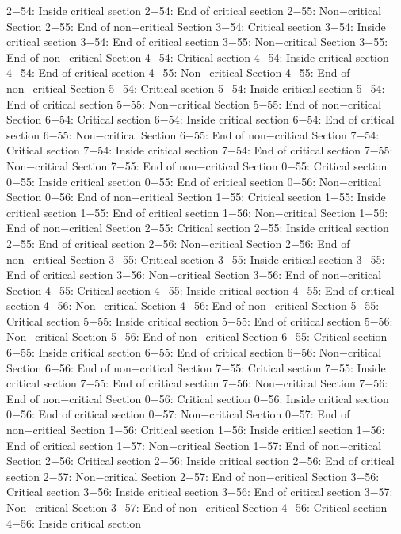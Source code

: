 2−54: Inside critical section
2−54: End of critical section
2−55: Non−critical Section
2−55: End of non−critical Section
3−54: Critical section
3−54: Inside critical section
3−54: End of critical section
3−55: Non−critical Section
3−55: End of non−critical Section
4−54: Critical section
4−54: Inside critical section
4−54: End of critical section
4−55: Non−critical Section
4−55: End of non−critical Section
5−54: Critical section
5−54: Inside critical section
5−54: End of critical section
5−55: Non−critical Section
5−55: End of non−critical Section
6−54: Critical section
6−54: Inside critical section
6−54: End of critical section
6−55: Non−critical Section
6−55: End of non−critical Section
7−54: Critical section
7−54: Inside critical section
7−54: End of critical section
7−55: Non−critical Section
7−55: End of non−critical Section
0−55: Critical section
0−55: Inside critical section
0−55: End of critical section
0−56: Non−critical Section
0−56: End of non−critical Section
1−55: Critical section
1−55: Inside critical section
1−55: End of critical section
1−56: Non−critical Section
1−56: End of non−critical Section
2−55: Critical section
2−55: Inside critical section
2−55: End of critical section
2−56: Non−critical Section
2−56: End of non−critical Section
3−55: Critical section
3−55: Inside critical section
3−55: End of critical section
3−56: Non−critical Section
3−56: End of non−critical Section
4−55: Critical section
4−55: Inside critical section
4−55: End of critical section
4−56: Non−critical Section
4−56: End of non−critical Section
5−55: Critical section
5−55: Inside critical section
5−55: End of critical section
5−56: Non−critical Section
5−56: End of non−critical Section
6−55: Critical section
6−55: Inside critical section
6−55: End of critical section
6−56: Non−critical Section
6−56: End of non−critical Section
7−55: Critical section
7−55: Inside critical section
7−55: End of critical section
7−56: Non−critical Section
7−56: End of non−critical Section
0−56: Critical section
0−56: Inside critical section
0−56: End of critical section
0−57: Non−critical Section
0−57: End of non−critical Section
1−56: Critical section
1−56: Inside critical section
1−56: End of critical section
1−57: Non−critical Section
1−57: End of non−critical Section
2−56: Critical section
2−56: Inside critical section
2−56: End of critical section
2−57: Non−critical Section
2−57: End of non−critical Section
3−56: Critical section
3−56: Inside critical section
3−56: End of critical section
3−57: Non−critical Section
3−57: End of non−critical Section
4−56: Critical section
4−56: Inside critical section
